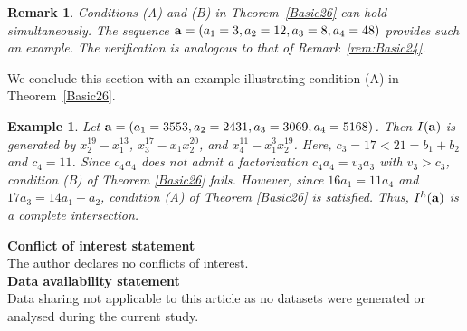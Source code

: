 \documentclass[10pt]{amsart}
\newtheorem{rem1}[thm1]{Remark}
\newtheorem{ex1}[thm1]{Example}
\begin{document}
\begin{rem1} {\rm Conditions {\rm (A)} and {\rm (B)} in Theorem~\ref{Basic26} can hold simultaneously. The sequence
${\bf a}=(a_1=3, a_2=12, a_3=8, a_4=48)$
provides such an example. The verification is analogous to that of Remark~\ref{rem:Basic24}.}
\end{rem1}

We conclude this section with an example illustrating condition {\rm (A)} in Theorem~\ref{Basic26}.

\begin{ex1} {\rm Let ${\bf a}=(a_{1}=3553,a_2=2431,a_3=3069,a_{4}=5168)$. Then $I({\bf a})$ is generated by $x_{2}^{19}-x_{1}^{13}$, $x_{3}^{17}-x_{1}x_{2}^{20}$, and $x_{4}^{11}-x_{1}^{3}x_{2}^{19}$. Here, $c_3=17<21=b_1+b_2$ and $c_4=11$. Since $c_4a_4$ does not admit a factorization $c_4a_4=v_3a_3$ with $v_3>c_3$, condition (B) of Theorem \ref{Basic26} fails. However, since $16a_1=11a_4$ and $17a_3=14a_1+a_2$, condition (A) of Theorem \ref{Basic26} is satisfied. Thus, $I^{h}({\bf a})$ is a complete intersection.}
\end{ex1}

\noindent \textbf{Conflict of interest statement}\\  The author declares no conflicts of interest.\\

\noindent \textbf{Data availability statement}\\Data sharing not applicable to this article as no datasets were generated or analysed during the current study.
\end{document}

